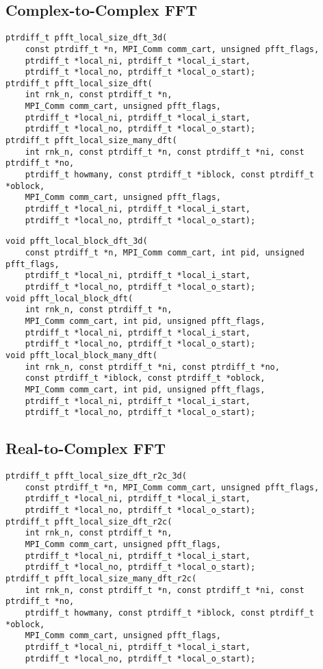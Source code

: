 \subsection{Complex-to-Complex FFT}
\begin{lstlisting}
ptrdiff_t pfft_local_size_dft_3d(
    const ptrdiff_t *n, MPI_Comm comm_cart, unsigned pfft_flags,
    ptrdiff_t *local_ni, ptrdiff_t *local_i_start,
    ptrdiff_t *local_no, ptrdiff_t *local_o_start);
ptrdiff_t pfft_local_size_dft(
    int rnk_n, const ptrdiff_t *n,
    MPI_Comm comm_cart, unsigned pfft_flags,
    ptrdiff_t *local_ni, ptrdiff_t *local_i_start,
    ptrdiff_t *local_no, ptrdiff_t *local_o_start);
ptrdiff_t pfft_local_size_many_dft(
    int rnk_n, const ptrdiff_t *n, const ptrdiff_t *ni, const ptrdiff_t *no,
    ptrdiff_t howmany, const ptrdiff_t *iblock, const ptrdiff_t *oblock,
    MPI_Comm comm_cart, unsigned pfft_flags,
    ptrdiff_t *local_ni, ptrdiff_t *local_i_start,
    ptrdiff_t *local_no, ptrdiff_t *local_o_start);
\end{lstlisting}

\begin{lstlisting}
void pfft_local_block_dft_3d(
    const ptrdiff_t *n, MPI_Comm comm_cart, int pid, unsigned pfft_flags,
    ptrdiff_t *local_ni, ptrdiff_t *local_i_start,
    ptrdiff_t *local_no, ptrdiff_t *local_o_start);
void pfft_local_block_dft(
    int rnk_n, const ptrdiff_t *n,
    MPI_Comm comm_cart, int pid, unsigned pfft_flags,
    ptrdiff_t *local_ni, ptrdiff_t *local_i_start,
    ptrdiff_t *local_no, ptrdiff_t *local_o_start);
void pfft_local_block_many_dft(
    int rnk_n, const ptrdiff_t *ni, const ptrdiff_t *no,
    const ptrdiff_t *iblock, const ptrdiff_t *oblock,
    MPI_Comm comm_cart, int pid, unsigned pfft_flags,
    ptrdiff_t *local_ni, ptrdiff_t *local_i_start,
    ptrdiff_t *local_no, ptrdiff_t *local_o_start);
\end{lstlisting}

\subsection{Real-to-Complex FFT}
\begin{lstlisting}
ptrdiff_t pfft_local_size_dft_r2c_3d(
    const ptrdiff_t *n, MPI_Comm comm_cart, unsigned pfft_flags,
    ptrdiff_t *local_ni, ptrdiff_t *local_i_start,
    ptrdiff_t *local_no, ptrdiff_t *local_o_start);
ptrdiff_t pfft_local_size_dft_r2c(
    int rnk_n, const ptrdiff_t *n,
    MPI_Comm comm_cart, unsigned pfft_flags,
    ptrdiff_t *local_ni, ptrdiff_t *local_i_start,
    ptrdiff_t *local_no, ptrdiff_t *local_o_start);
ptrdiff_t pfft_local_size_many_dft_r2c(
    int rnk_n, const ptrdiff_t *n, const ptrdiff_t *ni, const ptrdiff_t *no,
    ptrdiff_t howmany, const ptrdiff_t *iblock, const ptrdiff_t *oblock,
    MPI_Comm comm_cart, unsigned pfft_flags,
    ptrdiff_t *local_ni, ptrdiff_t *local_i_start,
    ptrdiff_t *local_no, ptrdiff_t *local_o_start);
\end{lstlisting}

